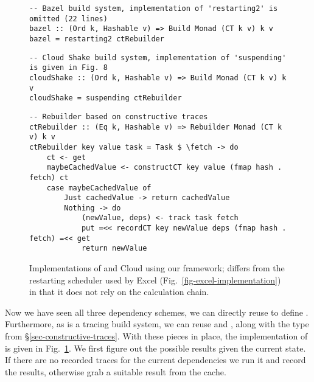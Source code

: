 \begin{figure}
\begin{verbatim}
-- Bazel build system, implementation of 'restarting2' is omitted (22 lines)
bazel :: (Ord k, Hashable v) => Build Monad (CT k v) k v
bazel = restarting2 ctRebuilder
\end{verbatim}
\vspace{1mm}
\begin{verbatim}
-- Cloud Shake build system, implementation of 'suspending' is given in Fig. 8
cloudShake :: (Ord k, Hashable v) => Build Monad (CT k v) k v
cloudShake = suspending ctRebuilder
\end{verbatim}
\vspace{1mm}
\begin{verbatim}
-- Rebuilder based on constructive traces
ctRebuilder :: (Eq k, Hashable v) => Rebuilder Monad (CT k v) k v
ctRebuilder key value task = Task $ \fetch -> do
    ct <- get
    maybeCachedValue <- constructCT key value (fmap hash . fetch) ct
    case maybeCachedValue of
        Just cachedValue -> return cachedValue
        Nothing -> do
            (newValue, deps) <- track task fetch
            put =<< recordCT key newValue deps (fmap hash . fetch) =<< get
            return newValue
\end{verbatim}
\vspace{-2mm}
\caption{Implementations of \Bazel and Cloud \Shake using our framework;
 differs from the restarting scheduler used by Excel
(Fig.~\ref{fig-excel-implementation}) in that it does not rely on the
calculation chain.}
\label{fig-bazel-cloud-shake-implementation}
\vspace{-2mm}
\end{figure}

Now we have seen all three dependency schemes, we can directly reuse
 to define \Bazel. Furthermore, as \Bazel is a tracing build
system, we can reuse  and , along with the 
type from \S\ref{sec-constructive-traces}. With these pieces in place, the
implementation of \Bazel is given in
Fig.~\ref{fig-bazel-cloud-shake-implementation}. We first figure out the
possible results given the current state. If there are no recorded traces for
the current dependencies we run it and record the results, otherwise grab a
suitable result from the  cache.

